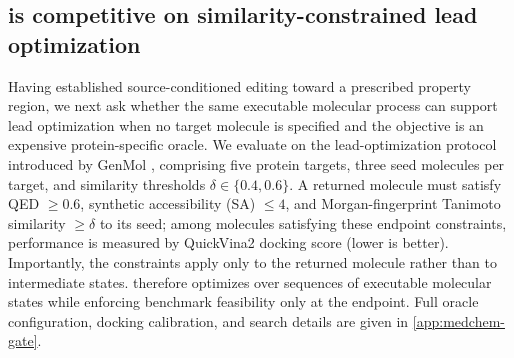 %
%
%
%

\subsection{\method{} is competitive on similarity-constrained lead optimization}
\label{sec:exp-t4}

Having established source-conditioned editing toward a prescribed property region, we next ask whether the same executable molecular process can support lead optimization when no target molecule is specified and the objective is an expensive protein-specific oracle. We evaluate \method{} on the lead-optimization protocol introduced by GenMol \citep{lee2025genmol}, comprising five protein targets, three seed molecules per target, and similarity thresholds $\delta\in\{0.4,0.6\}$. A returned molecule must satisfy QED $\geq0.6$, synthetic accessibility (SA) $\leq4$, and Morgan-fingerprint Tanimoto similarity $\geq\delta$ to its seed; among molecules satisfying these endpoint constraints, performance is measured by QuickVina2 docking score (lower is better). Importantly, the constraints apply only to the returned molecule rather than to intermediate states. \method{} therefore optimizes over sequences of executable molecular states while enforcing benchmark feasibility only at the endpoint. Full oracle configuration, docking calibration, and search details are given in \cref{app:medchem-gate}.

